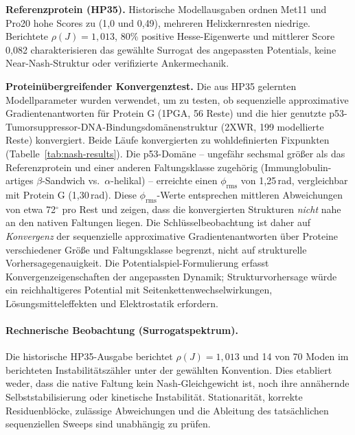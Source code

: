\documentclass[12pt,a4paper]{article}
\theoremstyle{remark}
\begin{document}
\textbf{Referenzprotein (HP35).} Historische Modellausgaben ordnen Met11 und Pro20 hohe Scores zu (1{,}0 und 0{,}49), mehreren Helixkernresten niedrige. Berichtete $\rho(J)=1{,}013$, 80\% positive Hesse-Eigenwerte und mittlerer Score 0{,}082 charakterisieren das gewählte Surrogat des angepassten Potentials, keine \glqq Near-Nash\grqq{}-Struktur oder verifizierte Ankermechanik.

\textbf{Proteinübergreifender Konvergenztest.} Die aus HP35 gelernten Modellparameter wurden verwendet, um zu testen, ob sequenzielle approximative Gradientenantworten für Protein G (1PGA, 56 Reste) und die hier genutzte p53-Tumorsuppressor-DNA-Bindungsdomänenstruktur (2XWR, 199 modellierte Reste) konvergiert. Beide Läufe konvergierten zu wohldefinierten Fixpunkten (Tabelle~\ref{tab:nash-results}). Die p53-Domäne -- ungefähr sechsmal größer als das Referenzprotein und einer anderen Faltungsklasse zugehörig (Immunglobulin-artiges $\beta$-Sandwich vs.\ $\alpha$-helikal) -- erreichte einen $\phi_{\text{rms}}$ von 1{,}25\,rad, vergleichbar mit Protein G (1{,}30\,rad). Diese $\phi_{\text{rms}}$-Werte entsprechen mittleren Abweichungen von etwa 72$^\circ$ pro Rest und zeigen, dass die konvergierten Strukturen \emph{nicht} nahe an den nativen Faltungen liegen. Die Schlüsselbeobachtung ist daher auf \emph{Konvergenz} der sequenzielle approximative Gradientenantworten über Proteine verschiedener Größe und Faltungsklasse begrenzt, nicht auf strukturelle Vorhersagegenauigkeit. Die Potentialspiel-Formulierung erfasst Konvergenzeigenschaften der angepassten Dynamik; Strukturvorhersage würde ein reichhaltigeres Potential mit Seitenkettenwechselwirkungen, Lösungsmitteleffekten und Elektrostatik erfordern.

\paragraph{Rechnerische Beobachtung (Surrogatspektrum).}
Die historische HP35-Ausgabe berichtet $\rho(J)=1{,}013$ und 14 von 70 Moden im berichteten Instabilitätszähler unter der gewählten Konvention. Dies etabliert weder, dass die native Faltung kein Nash-Gleichgewicht ist, noch ihre annähernde Selbststabilisierung oder kinetische Instabilität. Stationarität, korrekte Residuenblöcke, zulässige Abweichungen und die Ableitung des tatsächlichen sequenziellen Sweeps sind unabhängig zu prüfen.
\end{document}
